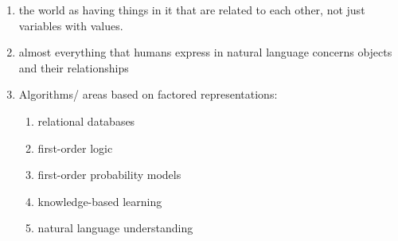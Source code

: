 \begin{enumerate}[itemsep=0.2cm]
    \item the world as having things in it that are related to each other, not just variables with values.
    \hfill \cite{ai/book/Artificial-Intelligence-A-Modern-Approach/Russell-Norvig}

    \item almost everything that humans express in natural language concerns objects and their relationships
    \hfill \cite{ai/book/Artificial-Intelligence-A-Modern-Approach/Russell-Norvig}

    \item Algorithms/ areas based on factored representations:
    \begin{enumerate}
        \item relational databases
        \hfill \cite{ai/book/Artificial-Intelligence-A-Modern-Approach/Russell-Norvig}

        \item first-order logic
        \hfill \cite{ai/book/Artificial-Intelligence-A-Modern-Approach/Russell-Norvig}

        \item first-order probability models 
        \hfill \cite{ai/book/Artificial-Intelligence-A-Modern-Approach/Russell-Norvig}

        \item knowledge-based learning
        \hfill \cite{ai/book/Artificial-Intelligence-A-Modern-Approach/Russell-Norvig}

        \item natural language understanding
        \hfill \cite{ai/book/Artificial-Intelligence-A-Modern-Approach/Russell-Norvig}
    \end{enumerate}
\end{enumerate}


